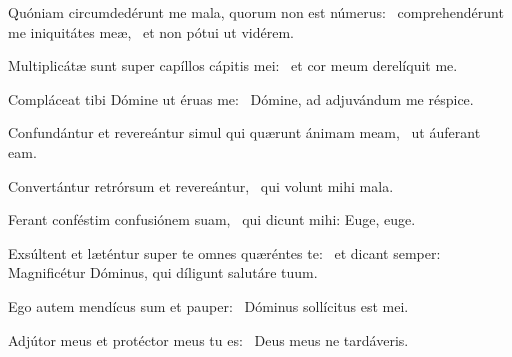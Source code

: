 \item Quóniam circumdedérunt me mala, quorum non est númerus:~\pscross{} comprehendérunt me iniquitátes meæ,~\psstar{} et non pótui ut vidérem.

\item Multiplicátæ sunt super capíllos cápitis mei:~\psstar{} et cor meum derelíquit me.

\item Compláceat tibi Dómine ut éruas me:~\psstar{} Dómine, ad adjuvándum me réspice.

\item Confundántur et revereántur simul qui quærunt ánimam meam,~\psstar{} ut áuferant eam.

\item Convertántur retrórsum et revereántur,~\psstar{} qui volunt mihi mala.

\item Ferant conféstim confusiónem suam,~\psstar{} qui dicunt mihi: Euge, euge.

\item Exsúltent et læténtur super te omnes quæréntes te:~\psstar{} et dicant semper: Magnificétur Dóminus, qui díligunt salutáre tuum.

\item Ego autem mendícus sum et pauper:~\psstar{} Dóminus sollícitus est mei.

\item Adjútor meus et protéctor meus tu es:~\psstar{} Deus meus ne tardáveris.